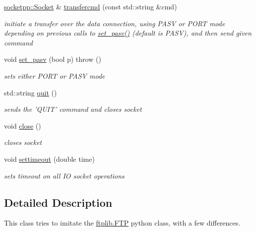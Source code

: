 \begin{CompactItemize}
\hyperlink{classsocketpp_1_1Socket}{socketpp::Socket} \& \hyperlink{classftplib_1_1FTP_c949b3cd7b92534705ff041bb43d989b}{transfercmd} (const std::string \&cmd)
\begin{CompactList}\small\item\em initiate a transfer over the data connection, using PASV or PORT mode depending on previous calls to \hyperlink{classftplib_1_1FTP_e35230239f093f01fb295ccb007de1b2}{set\_\-pasv()} (default is PASV), and then send given command \item\end{CompactList}\item 
void \hyperlink{classftplib_1_1FTP_e35230239f093f01fb295ccb007de1b2}{set\_\-pasv} (bool p)  throw ()
\begin{CompactList}\small\item\em sets either PORT or PASV mode \item\end{CompactList}\item 
std::string \hyperlink{classftplib_1_1FTP_bd6e018a5cc17b1c8007064830823c71}{quit} ()
\begin{CompactList}\small\item\em sends the 'QUIT' command and closes socket \item\end{CompactList}\item 
\hypertarget{classftplib_1_1FTP_4f36be9f23721435f19a7e5b1d702718}{
void \hyperlink{classftplib_1_1FTP_4f36be9f23721435f19a7e5b1d702718}{close} ()}
\label{classftplib_1_1FTP_4f36be9f23721435f19a7e5b1d702718}

\begin{CompactList}\small\item\em closes socket \item\end{CompactList}\item 
void \hyperlink{classftplib_1_1FTP_a6603cda3b7c44c48c6a2b8d688d3bb7}{settimeout} (double time)
\begin{CompactList}\small\item\em sets timeout on all IO socket operations \item\end{CompactList}\end{CompactItemize}


\subsection{Detailed Description}
This class tries to imitate the \hyperlink{classftplib_1_1FTP}{ftplib.FTP} python class, with a few differences. 

